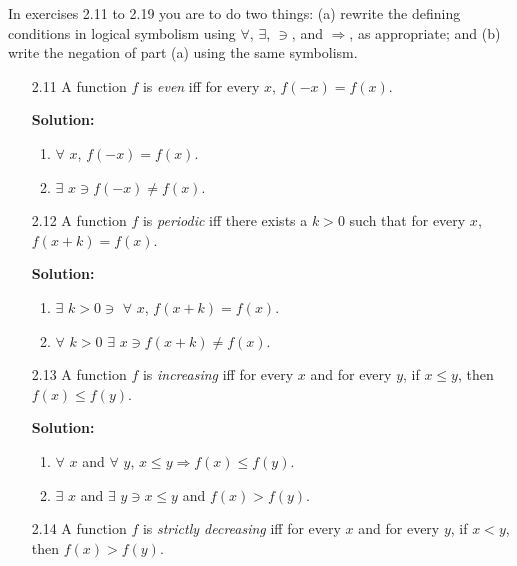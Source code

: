 \noindent In exercises 2.11 to 2.19 you are to do two things: (a) rewrite the 
defining conditions in logical symbolism using $\forall$, $\exists$, $\ni$, and
$\Rightarrow$, as appropriate; and (b) write the negation of part (a) using the
same symbolism.

\begin{enumerate}
   \item[2.11] A function $f$ is \textit{even} iff for every $x$,
               $f(-x) = f(x)$.

      \textbf{Solution:}
      
      \begin{enumerate}
         \item $\forall$ $x$, $f(-x) = f(x)$.
         \item $\exists$ $x \ni f(-x) \neq f(x)$.
      \end{enumerate}
   \item[2.12] A function $f$ is \textit{periodic} iff there exists a $k > 0$
               such that for every $x$, $f(x + k) = f(x)$.

      \textbf{Solution:}
      
      \begin{enumerate}
         \item $\exists$ $k > 0 \ni$ $\forall$ $x$, $f(x + k) = f(x)$.
         \item $\forall$ $k > 0$ $\exists$ $x \ni f(x + k) \neq f(x)$. 
      \end{enumerate}
   \item[2.13] A function $f$ is \textit{increasing} iff for every $x$ and for
               every $y$, if $x \le y$, then $f(x) \le f(y)$.

      \textbf{Solution:}
      
      \begin{enumerate}
         \item $\forall$ $x$ and $\forall$ $y$, $x \le y \Rightarrow
               f(x) \le f(y)$.
         \item $\exists$ $x$ and $\exists$ $y \ni x \le y$ and $f(x) > f(y)$.
      \end{enumerate}
   \item[2.14] A function $f$ is \textit{strictly decreasing} iff for every $x$ 
               and for every $y$, if $x < y$, then $f(x) > f(y)$.


\end{enumerate}
